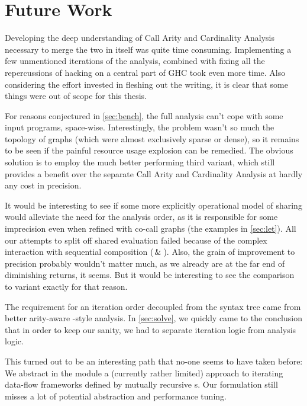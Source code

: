 \section{Future Work}\label{sec:fut}

Developing the deep understanding of Call Arity and Cardinality Analysis necessary to merge the two in itself was quite time consuming.
Implementing a few unmentioned iterations of the analysis, combined with fixing all the repercussions of hacking on a central part of GHC took even more time.
Also considering the effort invested in fleshing out the writing, it is clear that some things were out of scope for this thesis.

For reasons conjectured in \cref{sec:bench}, the full analysis can't cope with some input programs, space-wise.
Interestingly, the problem wasn't so much the topology of graphs (which were almost exclusively sparse or dense), so it remains to be seen if the painful resource usage explosion can be remedied.
The obvious solution is to employ the much better performing third variant, which still provides a benefit over the separate Call Arity and Cardinality Analysis at hardly any cost in precision.

It would be interesting to see if some more explicitly operational model of sharing would alleviate the need for the  analysis order, as it is responsible for some imprecision even when refined with co-call graphs (\cf the examples in \cref{sec:let}).
All our attempts to split off shared evaluation failed because of the complex interaction with sequential composition (\eg $\,\&\,$).
Also, the grain of improvement to precision probably wouldn't matter much, as we already are at the far end of diminishing returns, it seems.
But it would be interesting to see the comparison to variant \varedges exactly for that reason.

The requirement for an iteration order decoupled from the syntax tree came from better arity-aware -style analysis.
In \cref{sec:solve}, we quickly came to the conclusion that in order to keep our sanity, we had to separate iteration logic from analysis logic.

This turned out to be an interesting path that no-one seems to have taken before:
We abstract in the  module a (currently rather limited) approach to iterating data-flow frameworks defined by mutually recursive s.
Our formulation still misses a lot of potential abstraction and performance tuning.

